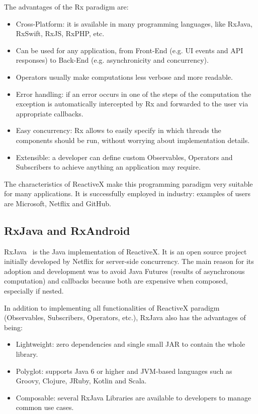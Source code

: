 \documentclass[11pt,a4paper,notitlepage]{article}
\begin{document}
The advantages of the Rx paradigm are:
\begin{itemize}
	\item Cross-Platform: it is available in many programming languages, like RxJava, RxSwift, RxJS, RxPHP, etc.
	\item Can be used for any application, from Front-End (e.g. UI events and API responses) to Back-End (e.g. asynchronicity and concurrency).
	\item Operators usually make computations less verbose and more readable.
	\item Error handling: if an error occurs in one of the steps of the computation the exception is automatically intercepted by Rx and forwarded to the user via appropriate callbacks.
	\item Easy concurrency: Rx allows to easily specify in which threads the components should be run, without worrying about implementation details.
	\item Extensible: a developer can define custom Observables, Operators and Subscribers to achieve anything an application may require.
\end{itemize}
The characteristics of ReactiveX make this programming paradigm very suitable for many applications. It is successfully employed in industry: examples of users are Microsoft, Netflix and GitHub.

\subsection{RxJava and RxAndroid}
RxJava~\cite{RxJava} is the Java implementation of ReactiveX. It is an open source project initially developed by Netflix for server-side concurrency. The main reason for its adoption and development was to avoid Java Futures (results of asynchronous computation) and callbacks because both are expensive when composed, especially if nested.

In addition to implementing all functionalities of ReactiveX paradigm (Observables, Subscribers, Operators, etc.), RxJava also has the advantages of being:
\begin{itemize}
	\item Lightweight: zero dependencies and single small JAR to contain the whole library.
	\item Polyglot: supports Java 6 or higher and JVM-based languages such as Groovy, Clojure, JRuby, Kotlin and Scala.
	\item Composable: several RxJava Libraries are available to developers to manage common use cases.
\end{itemize}
\end{document}
